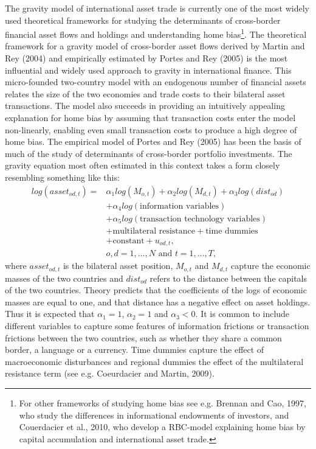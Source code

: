 \documentclass[12pt,a4paper]{article}
\begin{document}
The gravity model of international asset trade is currently one of the most widely used theoretical frameworks for studying the determinants of cross-border financial asset flows and holdings and understanding home bias\footnote{For other frameworks of studying home bias see e.g. Brennan and Cao, 1997, who study the differences in informational endowments of investors, and Couerdacier et al., 2010, who develop a RBC-model explaining home bias by capital accumulation and international asset trade.}. The theoretical framework for a gravity model of cross-border asset flows derived by Martin and Rey (2004) and empirically estimated by Portes and Rey (2005) is the most influential and widely used approach to gravity in international finance. This micro-founded two-country model with an endogenous number of financial assets relates the size of the two economies and trade costs to their bilateral asset transactions. The model also succeeds in providing an intuitively appealing explanation for home bias by assuming that transaction costs enter the model non-linearly, enabling even small transaction costs to produce a high degree of home bias. The empirical model of Portes and Rey (2005) has been the basis of much of the study of determinants of cross-border portfolio investments. The gravity equation most often estimated in this context takes a form closely resembling something like this:
\begin{align}
log(asset_{od,t})= & \alpha_1 log(M_{o,t})+\alpha_2 log(M_{d,t}) +\alpha_3 log(dist_{od}) \nonumber\\
& + \alpha_4 log(\text{information variables}) \nonumber\\
& + \alpha_5 log(\text{transaction technology variables})\nonumber\\
& + \text{multilateral resistance} + \text{time dummies} \nonumber\\
& + \text{constant}+ u_{od,t},  \\
& o, d=1, ..., N \text{ and } t=1, ..., T, \nonumber
\label{usual gravity}
\end{align}
where $asset_{od,t}$ is the bilateral asset position, $M_{o,t}$ and $M_{d,t}$ capture the economic masses of the two countries and $dist_{od}$ refers to the distance between the capitals of the two countries. Theory predicts that the coefficients of the logs of economic masses are equal to one, and that distance has a negative effect on asset holdings. Thus it is expected that $\alpha_1=1$, $\alpha_2=1$ and $\alpha_3<0$. It is common to include different variables to capture some features of information frictions or transaction frictions between the two countries, such as whether they share a common border, a language or a currency. Time dummies capture the effect of macroeconomic disturbances and regional dummies the effect of the multilateral resistance term (see e.g. Coeurdacier and Martin, 2009).
\end{document}
